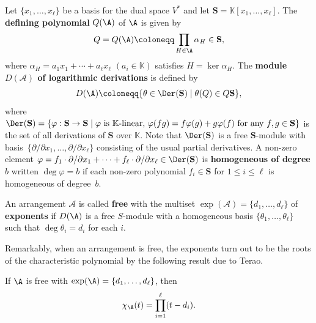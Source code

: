 Let $ \{x_{1}, \dots, x_{\ell}\} $ be a basis for the dual space $V^{\ast} $ and let $ \textbf{S}=\mathbb{K}[x_{1}, \dots, x_{\ell}] $. 
The \textbf{defining polynomial} $Q(\A)$ of $\A$ is given by
$$Q=Q(\A)\coloneqq \prod_{H \in \A} \alpha_H \in  \textbf{S},$$
where $ \alpha_H=a_1x_1+\cdots+a_\ell x_\ell$  $(a_i\in \mathbb{K})$ satisfies $H = \ker \alpha_H$. 
The \textbf{module $D(\mathcal{A}) $ of logarithmic derivations}  is defined by 
$$D(\A)\coloneqq  \{ \theta\in \Der(\textbf{S}) \mid \theta(Q) \in Q \textbf{S}\},$$
where $ \Der( \textbf{S}) = \{ \varphi: \textbf{S}\to  \textbf{S} \mid \mbox{$\varphi$ is $ \mathbb{K}$-linear,
$\varphi(fg)=f\varphi(g)+g\varphi(f)$ for any $f,g \in  \textbf{S}$}\}$ is the set of all derivations of $ \textbf{S} $ over $\mathbb{K}$. 
Note that $\Der( \textbf{S})$ is a free $ \textbf{S}$-module with basis~$\{\partial/\partial x_1,\ldots , \partial/\partial x_\ell\}$ consisting of the usual partial derivatives. 
A non-zero element $\varphi= f_1\cdot\partial/\partial x_1+\cdots+f_\ell\cdot\partial/\partial x_\ell\in  \Der( \textbf{S})$ is \textbf{homogeneous of degree $b$} written  $\deg\varphi=b$ if each non-zero polynomial $f_i\in  \textbf{S}$ for $1 \le i \le \ell$ is homogeneous of degree~$b$. 

\begin{definition}
\label{def:free-arr}
An arrangement $ \mathcal{A} $ is called \textbf{free} with the multiset $ \exp(\mathcal{A}) = \{d_{1}, \dots, d_{\ell}\} $ of \textbf{exponents} if $D(\A)$ is a free $S$-module with a homogeneous basis $ \{\theta_{1}, \dots, \theta_{\ell}\}$ such that $ \deg \theta_{i} = d_{i} $ for each $ i $.  
\end{definition}
Remarkably, when an arrangement is free, the exponents turn out to be the roots of the characteristic polynomial by the following result due to Terao. 
\begin{theorem}\label{thm:Factorization}
If $\A$ is free with $\exp(\A) =\{d_{1}, \dots, d_{\ell}\} $, then 
$$\chi_\A(t)= \prod_{i=1}^\ell (t-d_i).$$
\end{theorem}

